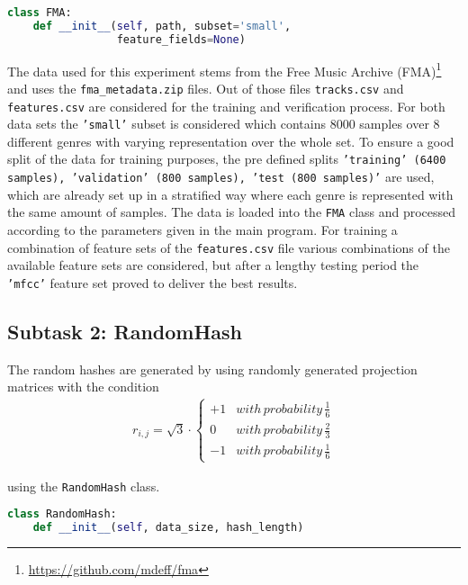 \documentclass[11pt]{article}
\begin{document}
\begin{file}
\begin{lstlisting}[language=Python]
class FMA:
    def __init__(self, path, subset='small',
                 feature_fields=None)
\end{lstlisting}
\end{file}
The data used for this experiment stems from the Free Music Archive (FMA)\footnote{\url{https://github.com/mdeff/fma}} and uses the \texttt{fma\_metadata.zip} files. Out of those files \texttt{tracks.csv} and \texttt{features.csv} are considered for the training and verification process. For both data sets the \texttt{'small'} subset is considered which contains 8000 samples over 8 different genres with varying representation over the whole set. To ensure a good split of the data for training purposes, the pre defined splits \texttt{'training' (6400 samples), 'validation' (800 samples), 'test (800 samples)'} are used, which are already set up in a stratified way where each genre is represented with the same amount of samples. The data is loaded into the \texttt{FMA} class and processed according to the parameters given in the main program. For training a combination of feature sets of the \texttt{features.csv} file various combinations of the available feature sets are considered, but after a lengthy testing period the \texttt{'mfcc'} feature set proved to deliver the best results.

\subsection*{Subtask 2: RandomHash}
The random hashes are generated by using randomly generated projection matrices with the condition
\begin{align*}
r_{i,j} = \sqrt{3} \cdot \left\{\begin{matrix}
+1 & with\,probability\,\frac{1}{6}\\ 
0 & with\,probability\,\frac{2}{3}\\ 
-1 & with\,probability\,\frac{1}{6}
\end{matrix}\right.
\end{align*}

using the \texttt{RandomHash} class.

\begin{file}
\begin{lstlisting}[language=Python]
class RandomHash:
    def __init__(self, data_size, hash_length)
\end{lstlisting}
\end{file}
\end{document}
